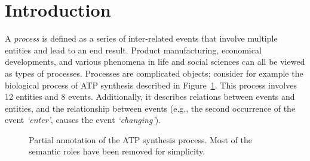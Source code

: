 \section{Introduction}

A \emph{process} is defined as a series of inter-related events that involve multiple entities and lead to an end result. Product manufacturing, economical developments, and various phenomena in life and social sciences can all be viewed as types of processes. Processes are complicated objects; consider for example the biological process of ATP synthesis described in Figure~\ref{fig:process}. This process involves 12 entities and 8 events. Additionally, it describes relations between events and entities, and the relationship between events (e.g., the second occurrence of the event \textit{`enter'}, causes the event \textit{`changing'}). 

\begin{figure}[ht]
\centering
{}
\caption{Partial annotation of the ATP synthesis process. Most of the semantic roles have been removed for simplicity.}
\label{fig:process}
\end{figure}

